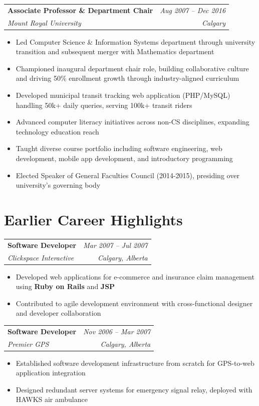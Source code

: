 \documentclass[11pt]{article}
\makeatletter
\newcommand{\tech}[1]{\textcolor{secondary}{\textbf{#1}}}
\newcommand{\experience}[4]{
  \vspace{4pt}
  \begin{tabular*}{\textwidth}{@{}l@{\extracolsep{\fill}}r@{}}
    \textbf{#1} & \textit{#2} \\
    \textit{\small#3} & \textit{\small#4}
  \end{tabular*}
  \vspace{-4pt}
}
\makeatother
\begin{document}
\experience{Associate Professor \& Department Chair}{Aug 2007 -- Dec 2016}{Mount Royal University}{Calgary}
\begin{itemize}
    \item Led Computer Science \& Information Systems department through university transition and subsequent merger with Mathematics department
    \item Championed inaugural department chair role, building collaborative culture and driving 50\% enrollment growth through industry-aligned curriculum
    \item Developed municipal transit tracking web application (PHP/MySQL) handling 50k+ daily queries, serving 100k+ transit riders
    \item Advanced computer literacy initiatives across non-CS disciplines, expanding technology education reach
    \item Taught diverse course portfolio including software engineering, web development, mobile app development, and introductory programming
    \item Elected Speaker of General Faculties Council (2014-2015), presiding over university's governing body
\end{itemize}

\newpage

\section*{Earlier Career Highlights}

\experience{Software Developer}{Mar 2007 -- Jul 2007}{Clickspace Interactive}{Calgary, Alberta}
\begin{itemize}
    \item Developed web applications for e-commerce and insurance claim management using \tech{Ruby on Rails} and \tech{JSP}
    \item Contributed to agile development environment with cross-functional designer and developer collaboration
\end{itemize}

\experience{Software Developer}{Nov 2006 -- Mar 2007}{Premier GPS}{Calgary, Alberta}
\begin{itemize}
    \item Established software development infrastructure from scratch for GPS-to-web application integration
    \item Designed redundant server systems for emergency signal relay, deployed with HAWKS air ambulance
\end{itemize}
\end{document}
